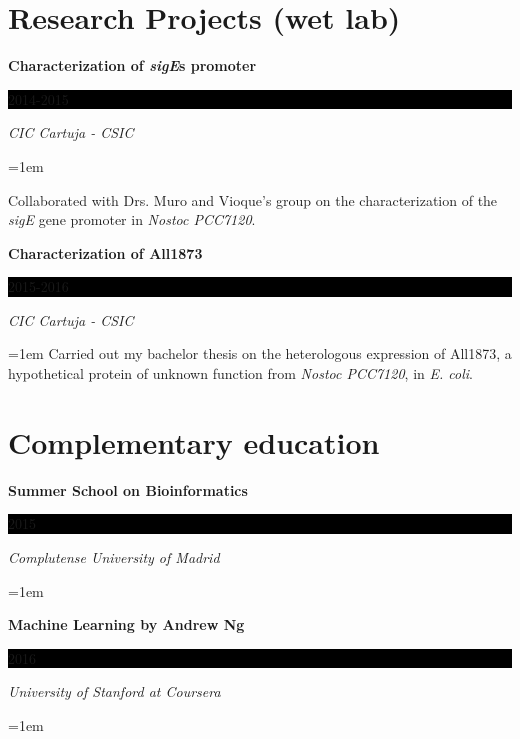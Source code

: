 \documentclass[paper=a4,fontsize=11pt]{article} %
\newlength{\spacebox}
\newcommand{\sepspace}{\vspace*{1em}}		%
\newcommand{\NewPart}[1]{\section*{
									{#1}}}
\newcommand{\PersonalEntry}[2]{
		\noindent\hangindent=2em\hangafter=0 %
		\parbox{\spacebox}{        %
		\textit{#1}}		       %
		\hspace{1.5em} #2 \par}    %
\newcommand{\EducationEntry}[4]{
		\noindent \textbf{#1} \hfill      %
		\colorbox{Black}{%
			\parbox{6em}{%
			\hfill\color{White}#2}} \par  %
		\noindent \textit{#3} \par        %
		\noindent\hangindent=1em\hangafter=0 \small #4 %
		\normalsize \par}
\newcommand{\AwardEntry}[4]{
		\noindent \textbf{#1} \hfill      %
		\colorbox{Black}{%
			\parbox{3em}{%
			\hfill\color{White}#2}} \par  %
		\noindent \textit{#3} \par        %
		  \noindent\hangindent=1em\hangafter=0 \small #4  %
		\normalsize \par}
\newcommand{\VolunteeringEntry}[2]{      %
		\noindent\hangindent=2em\hangafter=0 %
		\parbox{\spacebox}{        %
		\textit{#1}}			   %
		\hspace{1.5em} #2 \par}    %
\begin{document}
\NewPart{Research Projects (wet lab)}{}

\EducationEntry{Characterization of \textit{sigE}\textquotesingle s promoter}{2014-2015}{CIC Cartuja - CSIC}{\begin{changemargin}{0cm}{3cm}Collaborated with Drs. Muro and Vioque's group on the characterization of the \textit{sigE} gene promoter in \textit{Nostoc PCC7120}.\end{changemargin}}

\EducationEntry{Characterization of All1873}{2015-2016}{CIC Cartuja - CSIC}{Carried out my bachelor thesis on the heterologous expression of All1873, a hypothetical protein of unknown function from \textit{Nostoc PCC7120}, in \textit{E. coli}.}
  
  






  


  
  
\NewPart{Complementary education}{}


\AwardEntry{Summer School on Bioinformatics}{2015}{Complutense University of Madrid}{}  
  


\AwardEntry{Machine Learning by Andrew Ng}{2016}{University of Stanford at Coursera}{}






%
%
\end{document}
